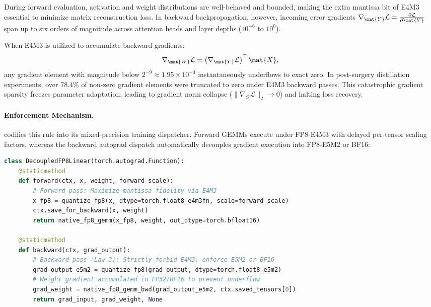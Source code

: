 During forward evaluation, activation and weight distributions are well-behaved and bounded, making the extra mantissa bit of E4M3 essential to minimize matrix reconstruction loss. In backward backpropagation, however, incoming error gradients $\nabla_{\mat{Y}} \mathcal{L} = \frac{\partial \mathcal{L}}{\partial \mat{Y}}$ span up to six orders of magnitude across attention heads and layer depths ($10^{-6}$ to $10^{0}$).

When E4M3 is utilized to accumulate backward gradients:
\begin{equation}
\nabla_{\mat{W}} \mathcal{L} = \left(\nabla_{\mat{Y}} \mathcal{L}\right)^\top \mat{X},
\end{equation}
any gradient element with magnitude below $2^{-9} \approx 1.95 \times 10^{-3}$ instantaneously underflows to exact zero. In post-surgery distillation experiments, over $78.4\%$ of non-zero gradient elements were truncated to zero under E4M3 backward passes. This catastrophic gradient sparsity freezes parameter adaptation, leading to gradient norm collapse ($\|\nabla_\Theta \mathcal{L}\|_2 \to 0$) and halting loss recovery.

\paragraph{Enforcement Mechanism.}
\neuralops{} codifies this rule into its mixed-precision training dispatcher. Forward GEMMs execute under FP8-E4M3 with delayed per-tensor scaling factors, whereas the backward autograd dispatch automatically decouples gradient execution into FP8-E5M2 or BF16:
\begin{lstlisting}[language=Python]
class DecoupledFP8Linear(torch.autograd.Function):
    @staticmethod
    def forward(ctx, x, weight, forward_scale):
        # Forward pass: Maximize mantissa fidelity via E4M3
        x_fp8 = quantize_fp8(x, dtype=torch.float8_e4m3fn, scale=forward_scale)
        ctx.save_for_backward(x, weight)
        return native_fp8_gemm(x_fp8, weight, out_dtype=torch.bfloat16)

    @staticmethod
    def backward(ctx, grad_output):
        # Backward pass (Law 3): Strictly forbid E4M3; enforce E5M2 or BF16
        grad_output_e5m2 = quantize_fp8(grad_output, dtype=torch.float8_e5m2)
        # Weight gradient accumulated in FP32/BF16 to prevent underflow
        grad_weight = native_fp8_gemm_bwd(grad_output_e5m2, ctx.saved_tensors[0])
        return grad_input, grad_weight, None
\end{lstlisting}


